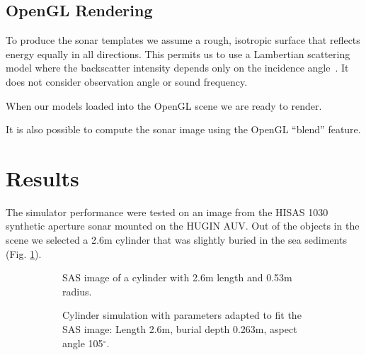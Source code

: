 \documentclass[
   UAM                                          %
 , 12pt                                         %
 , bibtex                                       %
 , layout
]{common/mytemplate}
\begin{document}
\subsection{OpenGL Rendering}

To produce the sonar templates we assume a rough, isotropic surface that reflects energy equally in all directions. This permits us to use a Lambertian scattering model where the backscatter intensity depends only on the incidence angle~\cite{Zhang1999}. It does not consider observation angle or sound frequency.   

When our models loaded into the OpenGL scene we are ready to render. 



It is also possible to compute the sonar image using the OpenGL ``blend'' feature.


\newpage

\section{Results}

\newlength\imgspacing\setlength\imgspacing{.5cm}

The simulator performance were tested on an image from the HISAS 1030 synthetic aperture sonar mounted on the HUGIN AUV. Out of the objects in the scene we selected a 2.6\;m cylinder that was slightly buried in the sea sediments (Fig. \ref{data_sylinder}).



\begin{figure}[tp]\centering%
\begin{subfigure}[t]{.5\linewidth-\imgspacing/2}
%
\caption{SAS image of a cylinder with 2.6\;m length and 0.53\;m radius.}\label{data_sylinder}%
\end{subfigure}
\begin{subfigure}[t]{.5\linewidth-\imgspacing/2}
%
\caption{Cylinder simulation with parameters adapted to fit the SAS image: Length 2.6\;m, burial depth 0.263\;m, aspect angle 105$^\circ$.}%
\end{subfigure}
\caption{}
\end{figure}

\setcounter{topnumber}{2}
\end{document}

